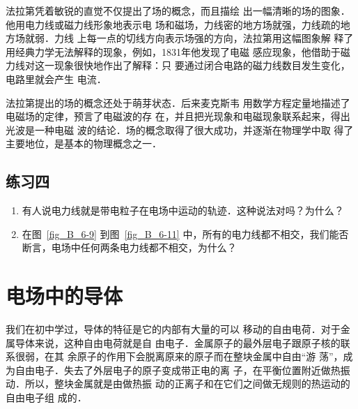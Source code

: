 法拉第凭着敏锐的直觉不仅提出了场的概念，而且描绘
出一幅清晰的场的图象．他用电力线或磁力线形象地表示电
场和磁场，力线密的地方场就强，力线疏的地方场就弱．力线
上每一点的切线方向表示场强的方向，法拉第用这幅图象解
释了用经典力学无法解释的现象，例如，1831年他发现了电磁
感应现象，他借助于磁力线对这一现象很快地作出了解释：只
要通过闭合电路的磁力线数目发生变化，电路里就会产生
电流．

法拉第提出的场的概念还处于萌芽状态．后来麦克斯韦
用数学方程定量地描述了电磁场的定律，预言了电磁波的存
在，并且把光现象和电磁现象联系起来，得出光波是一种电磁
波的结论．场的概念取得了很大成功，并逐渐在物理学中取
得了主要地位，是基本的物理概念之一．

\subsection*{练习四}

\begin{enumerate}
    \item 有人说电力线就是带电粒子在电场中运动的轨迹．这种说法对吗？为什么？
    \item 在图~\ref{fig_B_6-9} 到图~\ref{fig_B_6-11} 中，所有的电力线都不相交，我们能否断言，电场中任何两条电力线都不相交，为什么？
\end{enumerate}

\section{电场中的导体}
我们在初中学过，导体的特征是它的内部有大量的可以
移动的自由电荷．对于金属导体来说，这种自由电荷就是自
由电子．金属原子的最外层电子跟原子核的联系很弱，在其
余原子的作用下会脱离原来的原子而在整块金属中自由“游
荡”，成为自由电子．失去了外层电子的原子变成带正电的离
子，在平衡位置附近做热振动．所以，整块金属就是由做热振
动的正离子和在它们之间做无规则的热运动的自由电子组
成的．

